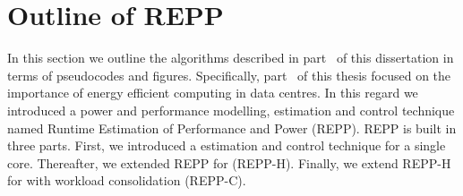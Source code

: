 \chapter{Outline of REPP}
\label{appendix1}


In this section we outline the algorithms described in part~ of this dissertation
in terms of pseudocodes and figures.  Specifically, part~ of this thesis focused on
the importance of energy efficient computing in data centres. In this regard we introduced
a power and performance modelling, estimation and control technique named Runtime
Estimation of Performance and Power (REPP). REPP is built in three parts. First, we
introduced a estimation and control technique for a single core. Thereafter, we extended
REPP for \muc \archs (REPP-H). Finally, we extend REPP-H for \muc \archs with workload
consolidation (REPP-C).  

